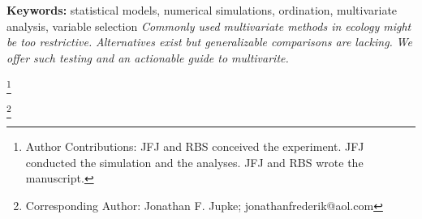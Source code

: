 \documentclass[a4paper,11pt]{article}
\newcommand\blfootnote[1]{%
  \begingroup
  \renewcommand\thefootnote{}\footnote{#1}%
  \addtocounter{footnote}{-1}%
  \endgroup
}
\begin{document}

        {\bf Keywords:} 
        statistical models,
        numerical simulations,
        ordination, 
        multivariate analysis, 
        variable selection
    \newpage
        \textit{Commonly used multivariate methods in ecology might be too restrictive.} 
        \textit{Alternatives exist but generalizable comparisons are lacking.}
        \textit{We offer such testing and an actionable guide to multivarite.}
        
        \blfootnote{Author Contributions: JFJ and RBS conceived the experiment. JFJ conducted the simulation and the analyses. JFJ and RBS wrote the manuscript.}
        \blfootnote{Corresponding Author: Jonathan F. Jupke; jonathanfrederik@aol.com}
    
    
    \newpage
\newpage







\end{document}
